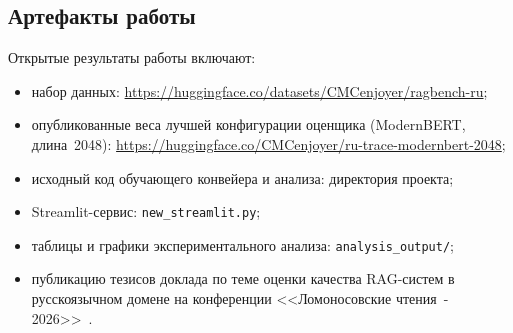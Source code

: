\subsection{Артефакты работы}

Открытые результаты работы включают:
\begin{itemize}
  \item набор данных: \url{https://huggingface.co/datasets/CMCenjoyer/ragbench-ru};
  \item опубликованные веса лучшей конфигурации оценщика (ModernBERT, длина~2048): \url{https://huggingface.co/CMCenjoyer/ru-trace-modernbert-2048};
  \item исходный код обучающего конвейера и анализа: директория проекта;
  \item Streamlit-сервис: \texttt{new\_streamlit.py};
  \item таблицы и графики экспериментального анализа: \texttt{analysis\_output/};
  \item публикацию тезисов доклада по теме оценки качества RAG-систем в русскоязычном
  домене на конференции <<Ломоносовские чтения~- 2026>>~\cite{moiseev2026ragru}.
\end{itemize}
